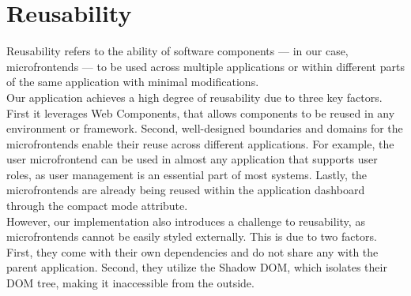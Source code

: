 \section{Reusability}
Reusability refers to the ability of software components — in our case, microfrontends — to be used across multiple applications or within different parts of the same application with minimal modifications. \\

\noindent
Our application achieves a high degree of reusability due to three key factors. First it leverages Web Components, that allows components to be reused in any environment or framework. Second, well-designed boundaries and domains for the microfrontends enable their reuse across different applications. For example, the user microfrontend can be used in almost any application that supports user roles, as user management is an essential part of most systems. Lastly, the microfrontends are already being reused within the application dashboard through the compact mode attribute. \\

\noindent
However, our implementation also introduces a challenge to reusability, as microfrontends cannot be easily styled externally. This is due to two factors. First, they come with their own dependencies and do not share any with the parent application. Second, they utilize the Shadow DOM, which isolates their DOM tree, making it inaccessible from the outside.